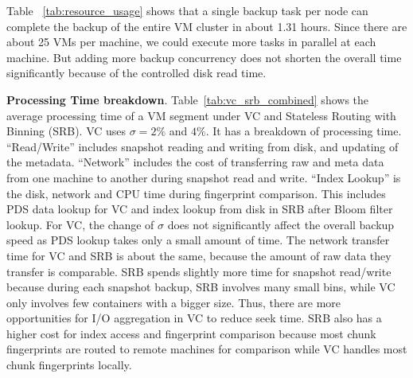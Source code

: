 Table ~\ref{tab:resource_usage} shows that  a single backup task per node can complete the backup of the entire
VM cluster in about 1.31 hours. Since there are about 25 VMs per machine, we could execute
more tasks in parallel at each machine. But adding more backup concurrency does not shorten the overall time
significantly because of the controlled  disk read time.

{\bf Processing Time breakdown}.
Table~\ref{tab:vc_srb_combined} shows
the  average  processing  time of  a VM segment under VC and Stateless Routing with Binning (SRB). 
VC uses $\sigma=2\%$ and $4\%$.
It has a breakdown of processing time.
``Read/Write'' includes snapshot reading and writing from disk, and 
updating of the metadata.
``Network'' includes the cost of transferring raw and meta data from one machine to another during 
snapshot read and write.
``Index Lookup'' is the disk, network and CPU time during fingerprint comparison.
This includes PDS data lookup for VC and index lookup from disk in SRB after Bloom filter lookup.
For VC, the change of $\sigma$ does not significantly affect the overall backup speed as
PDS lookup takes only a small amount of time. The network transfer time for VC and SRB is about the same, because the 
amount of raw data they transfer is comparable.
SRB spends slightly more time for snapshot read/write because during each snapshot  backup, SRB involves many small bins,
 while VC only involves few containers with a bigger size. Thus, there are more opportunities for I/O aggregation in VC to reduce seek time.
SRB also has a higher cost for index access and fingerprint comparison because most chunk fingerprints are routed
to remote machines for comparison while   VC handles most chunk fingerprints locally. 



